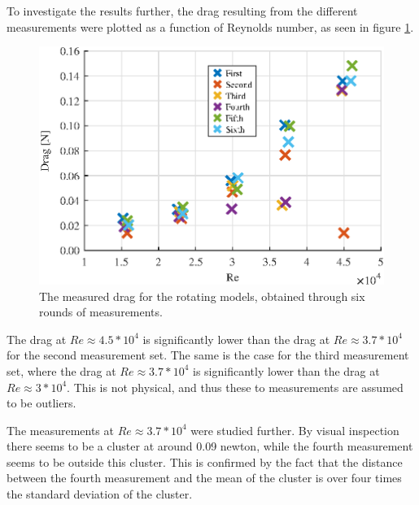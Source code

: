 To investigate the results further, the drag resulting from the different measurements were plotted as a function of Reynolds number, as seen in figure \ref{fig:RotationalDrag}.


\begin{figure}
    \centering
    \includegraphics[width=\linewidth]{0_Images/RotationalDragRe.eps}
    \caption{The measured drag for the rotating models, obtained through six rounds of measurements.}
    \label{fig:RotationalDrag}
\end{figure}

The drag at $Re \approx 4.5*10^4$ is significantly lower than the drag at $Re \approx 3.7*10^4$ for the second measurement set. The same is the case for the third measurement set, where the drag at $Re \approx 3.7*10^4$ is significantly lower than the drag at $Re \approx 3*10^4$. This is not physical, and thus these to measurements are assumed to be outliers. 

The measurements at $Re \approx 3.7*10^4$ were studied further. By visual inspection there seems to be a cluster at around 0.09 \si{newton}, while the fourth measurement seems to be outside this cluster. This is confirmed by the fact that the distance between the fourth measurement and the mean of the cluster is over four times the standard deviation of the cluster. 


